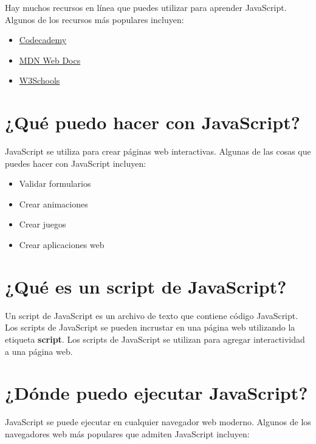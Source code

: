 \documentclass[
  a4paper,
  DIV=11,
  numbers=noendperiod,
  onepage,
  openany]{scrreprt}
\providecommand{\tightlist}{%
  \setlength{\itemsep}{0pt}\setlength{\parskip}{0pt}}\usepackage{longtable,booktabs,array}
\begin{document}
\begin{tcolorbox}
Hay muchos recursos en línea que puedes utilizar para aprender
JavaScript. Algunos de los recursos más populares incluyen:

\begin{itemize}
\tightlist
\item
  \href{https://www.codecademy.com/learn/introduction-to-javascript}{Codecademy}
\item
  \href{https://developer.mozilla.org/en-US/docs/Web/JavaScript}{MDN Web
  Docs}
\item
  \href{https://www.w3schools.com/js/default.asp}{W3Schools}
\end{itemize}

\section{¿Qué puedo hacer con
JavaScript?}\label{quuxe9-puedo-hacer-con-javascript}

JavaScript se utiliza para crear páginas web interactivas. Algunas de
las cosas que puedes hacer con JavaScript incluyen:

\begin{itemize}
\tightlist
\item
  Validar formularios
\item
  Crear animaciones
\item
  Crear juegos
\item
  Crear aplicaciones web
\end{itemize}

\section{¿Qué es un script de
JavaScript?}\label{quuxe9-es-un-script-de-javascript}

Un script de JavaScript es un archivo de texto que contiene código
JavaScript. Los scripts de JavaScript se pueden incrustar en una página
web utilizando la etiqueta \textbf{script}. Los scripts de JavaScript se
utilizan para agregar interactividad a una página web.

\section{¿Dónde puedo ejecutar
JavaScript?}\label{duxf3nde-puedo-ejecutar-javascript}

JavaScript se puede ejecutar en cualquier navegador web moderno. Algunos
de los navegadores web más populares que admiten JavaScript incluyen:


\end{tcolorbox}
\end{document}
